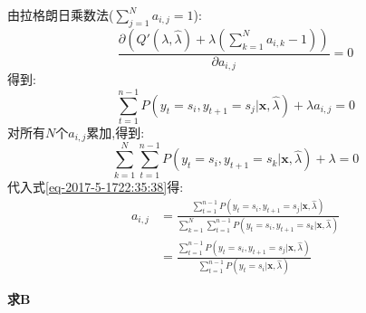\documentclass[UTF8,a4paper]{ctexart}%
\begin{document}
            由拉格朗日乘数法($\sum_{j = 1}^N a_{i,j} = 1$):
            \begin{equation}
              \frac{\partial\left( Q'(\lambda,\hat{\lambda}) + \lambda\left( \sum_{k = 1}^N a_{i,k} - 1 \right) \right)}{\partial a_{i,j}} = 0
            \end{equation}
            得到:
            \begin{equation}
              \sum_{t = 1}^{n-1}
                  P(y_t = s_i , y_{t+1} = s_j|\bm{x},\hat{\lambda})  + \lambda a_{i,j} = 0
              \label{eq-2017-5-1722:35:38}
            \end{equation}
            对所有$N$个$a_{i,j}$累加,得到:
            \begin{equation}
              \sum_{k = 1}^N \sum_{t = 1}^{n-1}
                  P(y_t = s_i , y_{t+1} = s_k|\bm{x},\hat{\lambda})  + \lambda = 0
            \end{equation}
            代入式\eqref{eq-2017-5-1722:35:38}得:
            \begin{equation}
              \begin{split}
              a_{i,j} &= \frac{ \sum_{t = 1}^{n-1}
                  P(y_t = s_i , y_{t+1} = s_j|\bm{x},\hat{\lambda}) }{\sum_{k = 1}^N \sum_{t = 1}^{n-1}
                  P(y_t = s_i , y_{t+1} = s_k|\bm{x},\hat{\lambda})}\\
                  &= \frac{ \sum_{t = 1}^{n-1}
                      P(y_t = s_i , y_{t+1} = s_j|\bm{x},\hat{\lambda}) }{ \sum_{t = 1}^{n-1}
                      P(y_t = s_i|\bm{x},\hat{\lambda})}
                \end{split}
            \end{equation}

            \textbf{求$\bm{B}$}
\end{document}
